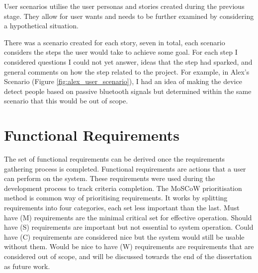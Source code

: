\documentclass{l4proj}
\begin{document}
User scenarios utilise the user personas and stories created during the previous stage. They allow for user wants and needs to be further examined by considering a hypothetical situation.

There was a scenario created for each story, seven in total, each scenario considers the steps the user would take to achieve some goal. For each step I considered questions I could not yet answer, ideas that the step had sparked, and general comments on how the step related to the project. For example, in Alex's Scenario (Figure \ref{fig:alex_user_scenario}), I had an idea of making the device detect people based on passive bluetooth signals but determined within the same scenario that this would be out of scope.

\section{Functional Requirements}

The set of functional requirements can be derived once the requirements gathering process is completed. Functional requirements are actions that a user can perform on the system. These requirements were used during the development process to track criteria completion. The MoSCoW prioritisation method \citep{hudaib_requirements_2018} is common way of prioritising requirements. It works by splitting requirements into four categories, each set less important than the last. Must have (M) requirements are the minimal critical set for effective operation. Should have (S) requirements are important but not essential to system operation. Could have (C) requirements are considered nice but the system would still be usable without them. Would be nice to have (W) requirements are requirements that are considered out of scope, and will be discussed towards the end of the dissertation as future work.
\end{document}
